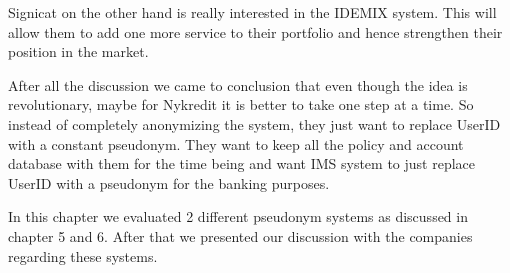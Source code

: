 Signicat on the other hand is really interested in the IDEMIX system. This will allow them to add one more service to their portfolio and hence strengthen their position in the market.

After all the discussion we came to conclusion that even though the idea is revolutionary, maybe for Nykredit it is better to take one step at a time. So instead of completely anonymizing the system, they just want to replace UserID with a constant pseudonym. They want to keep all the policy and account database with them for the time being and want IMS system to just replace UserID with a pseudonym for the banking purposes.

In this chapter we evaluated 2 different pseudonym systems as discussed in chapter 5 and 6. After that we presented our discussion with the companies regarding these systems.

